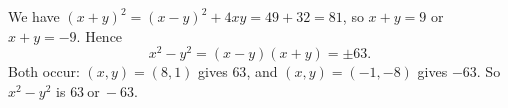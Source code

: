 We have $(x+y)^2=(x-y)^2+4xy=49+32=81$, so $x+y=9$ or $x+y=-9$. Hence
\[
x^2-y^2=(x-y)(x+y)=\pm63 .
\]
Both occur: $(x,y)=(8,1)$ gives $63$, and $(x,y)=(-1,-8)$ gives $-63$. So $x^2-y^2$ is $\boxed{63\ \text{or}\ -63}$.
